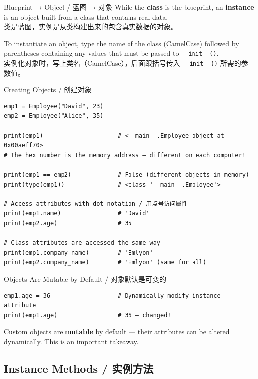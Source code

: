 \documentclass[11pt,a4paper]{report}
\let\oldtexttt\texttt
\renewcommand{\texttt}[1]{\textcolor{mainblue}{\oldtexttt{#1}}}
\begin{document}
\begin{concept}{Blueprint → Object / 蓝图 → 对象}
    While the \textbf{class} is the blueprint, an \textbf{instance} is an object built from a class that contains real data. \\
    类是蓝图，实例是从类构建出来的包含真实数据的对象。

    To instantiate an object, type the name of the class (CamelCase) followed by parentheses containing any values that must be passed to \texttt{\_\_init\_\_()}. \\
    实例化对象时，写上类名（CamelCase），后面跟括号传入 \texttt{\_\_init\_\_()} 所需的参数值。
\end{concept}

\begin{examplebox}{Creating Objects / 创建对象}
\begin{lstlisting}
emp1 = Employee("David", 23)
emp2 = Employee("Alice", 35)

print(emp1)                     # <__main__.Employee object at 0x00aeff70>
# The hex number is the memory address — different on each computer!

print(emp1 == emp2)             # False (different objects in memory)
print(type(emp1))               # <class '__main__.Employee'>

# Access attributes with dot notation / 用点号访问属性
print(emp1.name)                # 'David'
print(emp2.age)                 # 35

# Class attributes are accessed the same way
print(emp1.company_name)        # 'Emlyon'
print(emp2.company_name)        # 'Emlyon' (same for all)
\end{lstlisting}
\end{examplebox}

\begin{warning}{Objects Are Mutable by Default / 对象默认是可变的}
    \begin{lstlisting}
emp1.age = 36                   # Dynamically modify instance attribute
print(emp1.age)                 # 36 — changed!
    \end{lstlisting}
    Custom objects are \textbf{mutable} by default — their attributes can be altered dynamically. This is an important takeaway.
\end{warning}

\subsection{Instance Methods / 实例方法}
\end{document}
